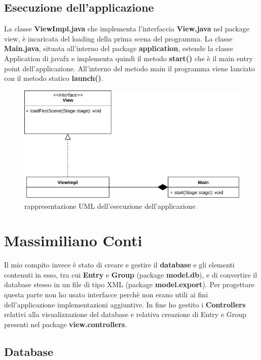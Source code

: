 \documentclass[a4paper,12pt]{report}
\begin{document}
\subsection*{Esecuzione dell'applicazione}
La classe \textbf{ViewImpl.java} che implementa l'interfaccia \textbf{View.java} nel package view, è incaricata del loading della prima scena del programma.
La classe \textbf{Main.java}, situata all'interno del package \textbf{application}, estende la classe Application di javafx e implementa quindi il metodo \textbf{start()} che è il main entry point dell'applicazione. All'interno del metodo main il programma viene lanciato con il metodo statico \textbf{launch()}.\\
\begin{figure}[h]
\centering{}
\includegraphics[width=\textwidth]{viewpart.png}
\caption{rappresentazione UML dell'esecuzione dell'applicazione}
\end{figure}


\section*{Massimiliano Conti}

Il mio compito invece è stato di creare e gestire il \textbf{database} e gli elementi contenuti in esso,
tra cui \textbf{Entry} e \textbf{Group} (package \textbf{model.db}), e di convertire il database stesso
in un file di tipo XML (package \textbf{model.export}).
Per progettare questa parte non ho usato interfacce perchè non erano utili ai fini dell'applicazione
implementazioni aggiuntive.
In fine ho gestito i \textbf{Controllers} relativi alla visualizzazione del database e relativa
creazione di Entry e Group presenti nel package \textbf{view.controllers}.

\subsection*{Database}
\end{document}
